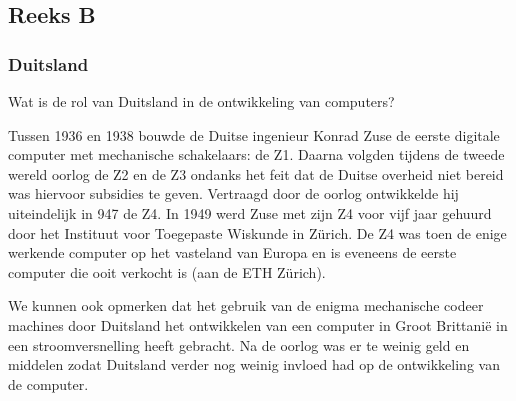 \documentclass[../main.tex]{subfiles}
\begin{document}
\subsection{Reeks B}
\subsubsection{Duitsland}
\begin{question}
Wat is de rol van Duitsland in de ontwikkeling van computers?
\end{question}
\begin{solution}
Tussen 1936 en 1938 bouwde de Duitse ingenieur Konrad Zuse de eerste digitale computer met mechanische schakelaars: de Z1.
Daarna volgden tijdens de tweede wereld oorlog de Z2 en de Z3 ondanks het feit dat de Duitse overheid niet bereid was hiervoor subsidies te geven.
Vertraagd door de oorlog ontwikkelde hij uiteindelijk in 947 de Z4. In 1949 werd Zuse met zijn Z4 voor vijf jaar gehuurd door het Instituut voor Toegepaste Wiskunde in Z\"urich.
De Z4 was toen de enige werkende computer op het vasteland van Europa en is eveneens de eerste computer die ooit verkocht is (aan de ETH Z\"urich).

We kunnen ook opmerken dat het gebruik van de enigma mechanische codeer machines door Duitsland het ontwikkelen van een computer in Groot Brittani\"e in een stroomversnelling heeft gebracht. Na de oorlog was er te weinig geld en middelen zodat Duitsland verder nog weinig invloed had op de ontwikkeling van de computer.
\end{solution}
\end{document}
